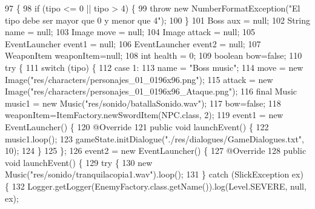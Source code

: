 \begin{DoxyCode}
97                                                                                                            
            \{
98         \textcolor{keywordflow}{if} (tipo <= 0 || tipo > 4) \{
99             \textcolor{keywordflow}{throw} \textcolor{keyword}{new} NumberFormatException(\textcolor{stringliteral}{"El tipo debe ser mayor que 0 y menor que 4"});
100         \}
101         Boss aux = null;
102         String name = null;
103         Image move = null;
104         Image attack = null;
105         EventLauncher event1 = null;
106         EventLauncher event2 = null;
107         WeaponItem weaponItem=null;
108         \textcolor{keywordtype}{int} health = 0;
109 \textcolor{keywordtype}{boolean} bow=\textcolor{keyword}{false};
110         \textcolor{keywordflow}{try} \{
111             \textcolor{keywordflow}{switch} (tipo) \{
112                 \textcolor{keywordflow}{case} 1:
113                     name = \textcolor{stringliteral}{"Boss music"};
114                     move = \textcolor{keyword}{new} Image(\textcolor{stringliteral}{"res/characters/personajes\_01\_0196x96.png"});
115                     attack = \textcolor{keyword}{new} Image(\textcolor{stringliteral}{"res/characters/personajes\_01\_0196x96\_Ataque.png"});
116                     \textcolor{keyword}{final} Music music1 = \textcolor{keyword}{new} Music(\textcolor{stringliteral}{"res/sonido/batallaSonido.wav"});
117                     bow=\textcolor{keyword}{false};
118                     weaponItem=ItemFactory.newSwordItem(NPC.class, 2);
119                     event1 = \textcolor{keyword}{new} EventLauncher() \{
120                         @Override
121                         \textcolor{keyword}{public} \textcolor{keywordtype}{void} launchEvent() \{
122                             music1.loop();
123                             gameState.initDialogue(\textcolor{stringliteral}{"./res/dialogues/GameDialogues.txt"}, 10);
124                         \}
125                     \};
126                     event2 = \textcolor{keyword}{new} EventLauncher() \{
127                         @Override
128                         \textcolor{keyword}{public} \textcolor{keywordtype}{void} launchEvent() \{
129                             \textcolor{keywordflow}{try} \{
130                                 \textcolor{keyword}{new} Music(\textcolor{stringliteral}{"res/sonido/tranquilacopia1.wav"}).loop();
131                             \} \textcolor{keywordflow}{catch} (SlickException ex) \{
132                                 Logger.getLogger(EnemyFactory.class.getName()).log(Level.SEVERE, null, ex);

\end{DoxyCode}
